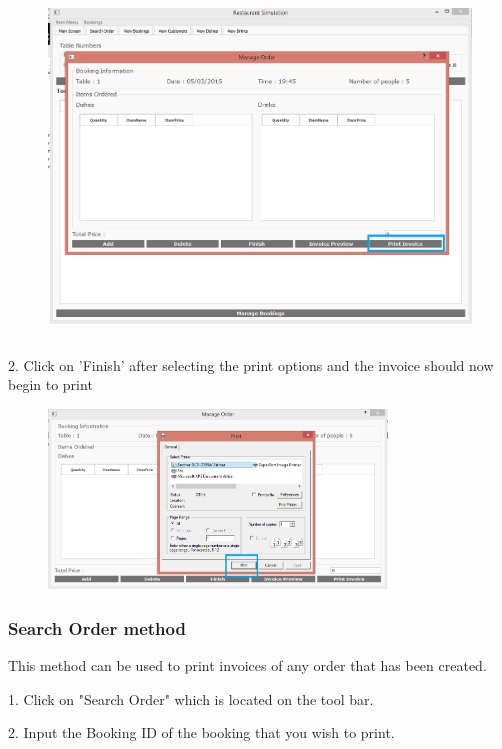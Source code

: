 \begin{figure}[H]
    \includegraphics[height = 9cm]{./Manual/images/PrintInvoice1} 
    \caption{} \label{fig:printinvoice1}
\end{figure}

2. Click on 'Finish' after selecting the print options and the invoice should now begin to print
 
\begin{figure}[H]
    \includegraphics[width = 9cm]{./Manual/images/PrintInvoice2} 
    \caption{} \label{fig:printinvoice2}
\end{figure}

\subsubsection{Search Order method}
This method can be used to print invoices of any order that has been created.

1. Click on "Search Order" which is located on the tool bar.

2. Input the Booking ID of the booking that you wish to print.

